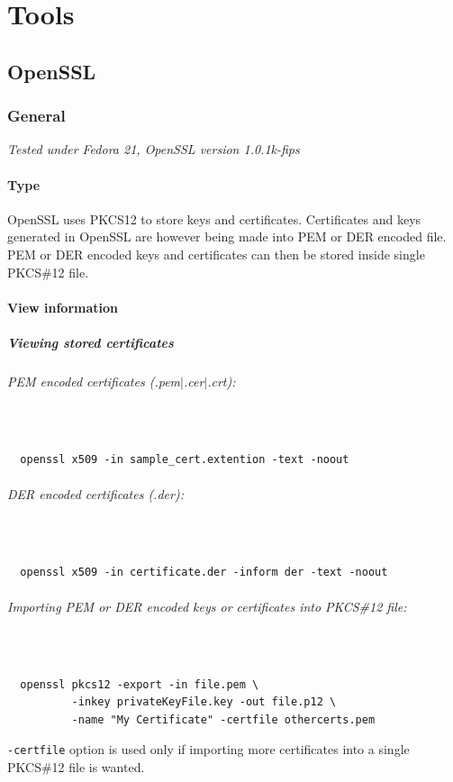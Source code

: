 \documentclass[10pt, a4paper]{report}
\newcommand{\myparagraph}[1]{\paragraph{#1}\mbox{}\\} %
\begin{document}
\newpage
\part{Tools}

\chapter{OpenSSL}

\section{General}
\textit{Tested under Fedora 21, OpenSSL version 1.0.1k-fips}
  \subsection{Type}
  OpenSSL uses PKCS12 to store keys and certificates. Certificates and keys generated in OpenSSL are however being made into PEM or DER encoded file. PEM or DER encoded keys and certificates can then be stored inside single PKCS\#12 file. 
             
  \subsection{View information}
  
\subsubsection{Viewing stored certificates}
\myparagraph{PEM encoded certificates (.pem$\vert$.cer$\vert$.crt):}
  \begin{verbatim}
  openssl x509 -in sample_cert.extention -text -noout
  \end{verbatim}
\myparagraph{DER encoded certificates (.der):}
  \begin{verbatim}
  openssl x509 -in certificate.der -inform der -text -noout
  \end{verbatim}
\myparagraph{Importing PEM or DER encoded keys or certificates into PKCS\#12 file:}
  \begin{verbatim}
  openssl pkcs12 -export -in file.pem \
          -inkey privateKeyFile.key -out file.p12 \
          -name "My Certificate" -certfile othercerts.pem
  \end{verbatim}
\verb+-certfile+ option is used only if importing more certificates into a single PKCS\#12 file is wanted.
\end{document}
